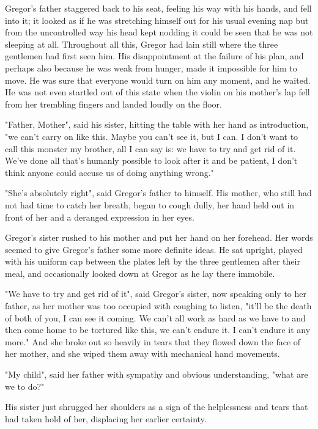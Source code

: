 \documentclass[12pt]{book}
\begin{document}
    Gregor's father staggered back to his seat, feeling his way with his hands, and fell into it; it looked as if he was stretching himself out for his usual evening nap but from the uncontrolled way his head kept nodding it could be seen that he was not sleeping at all. Throughout all this, Gregor had lain still where the three gentlemen had first seen him. His disappointment at the failure of his plan, and perhaps also because he was weak from hunger, made it impossible for him to move. He was sure that everyone would turn on him any moment, and he waited. He was not even startled out of this state when the violin on his mother's lap fell from her trembling fingers and landed loudly on the floor.

    "Father, Mother", said his sister, hitting the table with her hand as introduction, "we can't carry on like this. Maybe you can't see it, but I can. I don't want to call this monster my brother, all I can say is: we have to try and get rid of it. We've done all that's humanly possible to look after it and be patient, I don't think anyone could accuse us of doing anything wrong."

    "She's absolutely right", said Gregor's father to himself. His mother, who still had not had time to catch her breath, began to cough dully, her hand held out in front of her and a deranged expression in her eyes.

    Gregor's sister rushed to his mother and put her hand on her forehead. Her words seemed to give Gregor's father some more definite ideas. He sat upright, played with his uniform cap between the plates left by the three gentlemen after their meal, and occasionally looked down at Gregor as he lay there immobile.

    "We have to try and get rid of it", said Gregor's sister, now speaking only to her father, as her mother was too occupied with coughing to listen, "it'll be the death of both of you, I can see it coming. We can't all work as hard as we have to and then come home to be tortured like this, we can't endure it. I can't endure it any more." And she broke out so heavily in tears that they flowed down the face of her mother, and she wiped them away with mechanical hand movements.

    "My child", said her father with sympathy and obvious understanding, "what are we to do?"

    His sister just shrugged her shoulders as a sign of the helplessness and tears that had taken hold of her, displacing her earlier certainty.
\end{document}

